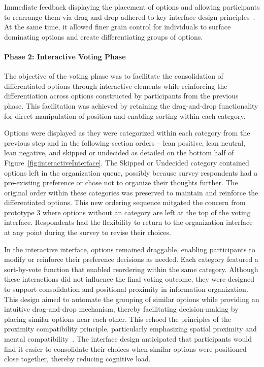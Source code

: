 Immediate feedback displaying the placement of options and allowing participants to rearrange them via drag-and-drop adhered to key interface design principles~\cite{norman2013design}. At the same time, it allowed finer grain control for individuals to surface dominating options and create differentiating groups of options.

\paragraph{Phase 2: Interactive Voting Phase}

The objective of the voting phase was to facilitate the consolidation of differentiated options through interactive elements while reinforcing the differentiation across options constructed by participants from the previous phase. This facilitation was achieved by retaining the drag-and-drop functionality for direct manipulation of position and enabling sorting within each category.

Options were displayed as they were categorized within each category from the previous step and in the following section orders -- lean positive, lean neutral, lean negative, and skipped or undecided as detailed on the bottom half of Figure~\ref{fig:interactiveInterface}. The Skipped or Undecided category contained options left in the organization queue, possibly because survey respondents had a pre-existing preference or chose not to organize their thoughts further. The original order within these categories was preserved to maintain and reinforce the differentiated options. This new ordering sequence mitgated the concern from prototype 3 where options without an category are left at the top of the voting interface. Respondents had the flexibility to return to the organization interface at any point during the survey to revise their choices.

In the interactive interface, options remained draggable, enabling participants to modify or reinforce their preference decisions as needed. Each category featured a sort-by-vote function that enabled reordering within the same category. Although these interactions did not influence the final voting outcome, they were designed to support consolidation and positional proximity in information organization. This design aimed to automate the grouping of similar options while providing an intuitive drag-and-drop mechanism, thereby facilitating decision-making by placing similar options near each other. This echoed the principles of the proximity compatibility principle, particularly emphasizing spatial proximity and mental compatibility~\cite{wickens1990proximity}. The interface design anticipated that participants would find it easier to consolidate their choices when similar options were positioned close together, thereby reducing cognitive load.

